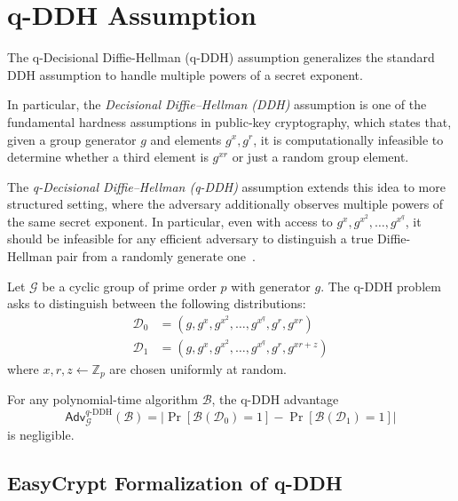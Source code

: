 \section{q-DDH Assumption}
\label{sec:q-ddh-assumption}

The q-Decisional Diffie-Hellman (q-DDH) assumption generalizes the standard DDH assumption to handle multiple powers of a secret exponent.

In particular, the \textit{Decisional Diffie--Hellman (DDH)} assumption is one of the fundamental hardness assumptions in public-key cryptography, which states that, given a group generator $g$ and elements $g^x, g^r$, it is computationally infeasible to determine whether a third element is $g^{xr}$ or just a random group element. 

The \textit{q-Decisional Diffie--Hellman (q-DDH)} assumption extends this idea to more structured setting, where the adversary additionally observes multiple powers of the same secret exponent. 
In particular, even with access to $g^x, g^{x^2}, \ldots, g^{x^q}$, it should be infeasible for any efficient adversary to distinguish a true Diffie-Hellman pair from a randomly generate one~\cite{ddh2015}.

\begin{definition}
\label{def:q-ddh-problem}
Let $\mathcal{G}$ be a cyclic group of prime order $p$ with generator $g$. The q-DDH problem asks to distinguish between the following distributions:
\begin{align}
\mathcal{D}_0 &= (g, g^x, g^{x^2}, \ldots, g^{x^q}, g^r, g^{xr}) \\
\mathcal{D}_1 &= (g, g^x, g^{x^2}, \ldots, g^{x^q}, g^r, g^{xr+z})
\end{align}
where $x, r, z \leftarrow \mathbb{Z}_p$ are chosen uniformly at random.
\end{definition}

\begin{assumption}
\label{ass:q-ddh}
For any polynomial-time algorithm $\mathcal{B}$, the q-DDH advantage
\[
\mathsf{Adv}^{q\text{-DDH}}_{\mathcal{G}}(\mathcal{B}) = \left| \Pr[\mathcal{B}(\mathcal{D}_0) = 1] - \Pr[\mathcal{B}(\mathcal{D}_1) = 1] \right|
\]
is negligible.
\end{assumption}

\subsection{EasyCrypt Formalization of q-DDH}

